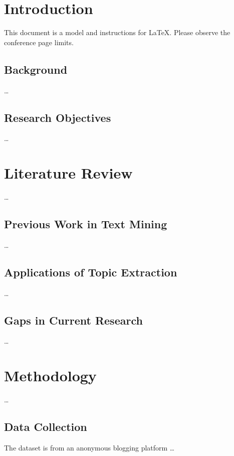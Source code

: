 \documentclass[conference,a4paper]{IEEEtran}
\begin{document}
\section{Introduction}
This document is a model and instructions for \LaTeX.
Please observe the conference page limits. 

\subsection{Background}

\dots

\subsection{Research Objectives}

\dots

\section{Literature Review}

\dots

\subsection{Previous Work in Text Mining}

\dots

\subsection{Applications of Topic Extraction}

\dots

\subsection{Gaps in Current Research}

\dots

\section{Methodology}

\dots

\subsection{Data Collection}

The dataset is from an anonymous blogging platform \dots
\end{document}
